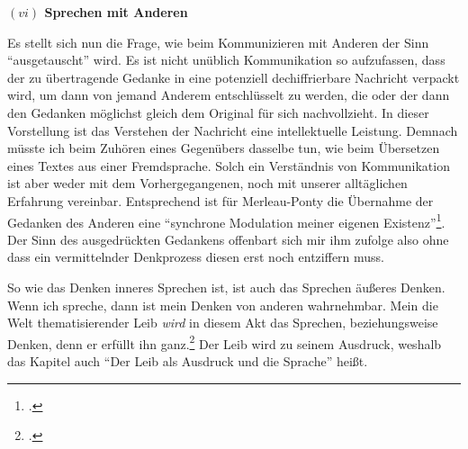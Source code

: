 \documentclass[a4paper, 12pt]{article}
\begin{document}
\begin{onehalfspace}
\noindent\textbf{$(vi)$ Sprechen mit Anderen}

\noindent Es stellt sich nun die Frage, wie beim Kommunizieren mit Anderen der Sinn "`ausgetauscht"' wird. Es ist nicht unüblich Kommunikation so aufzufassen, dass der zu übertragende Gedanke in eine potenziell dechiffrierbare Nachricht verpackt wird, um dann von jemand Anderem entschlüsselt zu werden, die oder der dann den Gedanken möglichst gleich dem Original für sich nachvollzieht. In dieser Vorstellung ist das Verstehen der Nachricht eine intellektuelle Leistung. Demnach müsste ich beim Zuhören eines Gegenübers dasselbe tun, wie beim Übersetzen eines Textes aus einer Fremdsprache. Solch ein Verständnis von Kommunikation ist aber weder mit dem Vorhergegangenen, noch mit unserer alltäglichen Erfahrung vereinbar. Entsprechend ist für Merleau-Ponty die Übernahme der Gedanken des Anderen eine "`synchrone Modulation meiner eigenen Existenz"'\footnote{\Cite[Siehe][S. 218]{merleau1966phanomenologie}.}. Der Sinn des ausgedrückten Gedankens offenbart sich mir ihm zufolge also ohne dass ein vermittelnder Denkprozess diesen erst noch entziffern muss.

So wie das Denken inneres Sprechen ist, ist auch das Sprechen äußeres Denken. Wenn ich spreche, dann ist mein Denken von anderen wahrnehmbar. Mein die Welt thematisierender Leib \emph{wird} in diesem Akt das Sprechen, beziehungsweise Denken, denn er erfüllt ihn ganz.\footnote{\Cite[Vgl.][S. 233]{merleau1966phanomenologie}.} Der Leib wird zu seinem Ausdruck, weshalb das Kapitel auch "`Der Leib als Ausdruck und die Sprache"' heißt. %


\end{onehalfspace}
\end{document}
